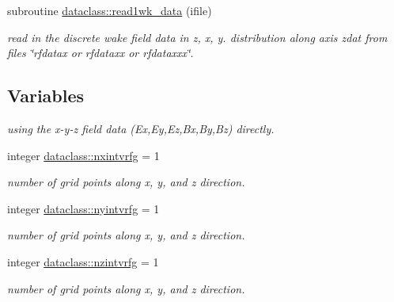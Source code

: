 \begin{DoxyCompactItemize}
subroutine \mbox{\hyperlink{namespacedataclass_a2fed396f3daf5a5c465b01235d98c776}{dataclass\+::read1wk\+\_\+data}} (ifile)
\begin{DoxyCompactList}\small\item\em read in the discrete wake field data in z, x, y. distribution along axis zdat from files \char`\"{}rfdatax or rfdataxx 
 or rfdataxxx\char`\"{}. \end{DoxyCompactList}\end{DoxyCompactItemize}
\subsection*{Variables}
\textbf{ }\par
{\em using the x-\/y-\/z field data (Ex,Ey,Ez,Bx,By,Bz) directly. }\begin{DoxyCompactItemize}
\item 
integer \mbox{\hyperlink{namespacedataclass_a6302bc97206196f7003db67abd75507e}{dataclass\+::nxintvrfg}} = 1
\begin{DoxyCompactList}\small\item\em number of grid points along x, y, and z direction. \end{DoxyCompactList}\item 
integer \mbox{\hyperlink{namespacedataclass_a32c01f4c7d58343edc8d318b2e5f4760}{dataclass\+::nyintvrfg}} = 1
\begin{DoxyCompactList}\small\item\em number of grid points along x, y, and z direction. \end{DoxyCompactList}\item 
integer \mbox{\hyperlink{namespacedataclass_a53f757bd562f34f7e8e6bb58606fc289}{dataclass\+::nzintvrfg}} = 1
\begin{DoxyCompactList}\small\item\em number of grid points along x, y, and z direction. \end{DoxyCompactList}\end{DoxyCompactItemize}

